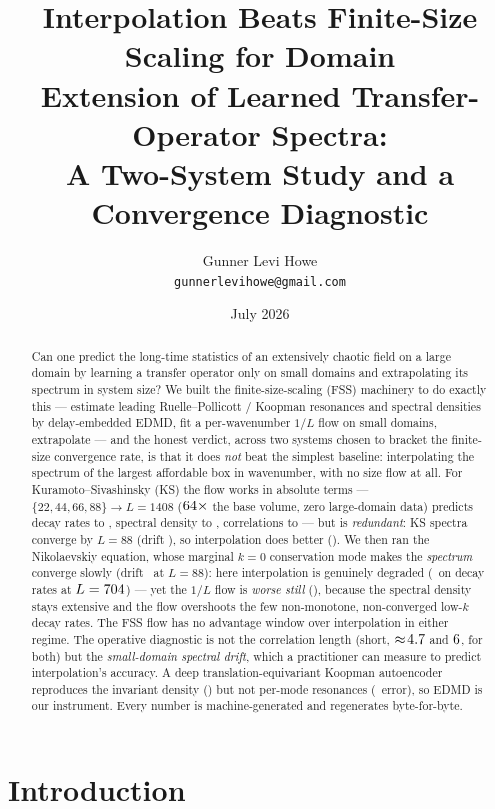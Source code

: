 \documentclass[11pt]{article}
\title{\vspace{-3em}Interpolation Beats Finite-Size Scaling for Domain\\
Extension of Learned Transfer-Operator Spectra:\\
A Two-System Study and a Convergence Diagnostic}
\author{Gunner Levi Howe\\ \small\texttt{gunnerlevihowe@gmail.com}}
\date{July 2026}
\begin{document}
\maketitle

\begin{abstract}
Can one predict the long-time statistics of an extensively chaotic field on a
large domain by learning a transfer operator only on small domains and
extrapolating its spectrum in system size? We built the finite-size-scaling (FSS)
machinery to do exactly this --- estimate leading Ruelle--Pollicott / Koopman
resonances and spectral densities by delay-embedded EDMD, fit a per-wavenumber
$1/L$ flow on small domains, extrapolate --- and the honest verdict, across two
systems chosen to bracket the finite-size convergence rate, is that it does
\emph{not} beat the simplest baseline: interpolating the spectrum of the largest
affordable box in wavenumber, with no size flow at all. For Kuramoto--Sivashinsky
(KS) the flow works in absolute terms --- $\{22,44,66,88\}\!\to\!L=1408$
($64\times$ the base volume, zero large-domain data) predicts decay
rates to \FlowTargetGamma, spectral density to \FlowTargetSPct, correlations to
\FlowTargetC --- but is \emph{redundant}: KS spectra converge by $L=88$ (drift
\ConvEightEightGamma), so interpolation does better (\InterpEightEightGamma). We
then ran the Nikolaevskiy equation, whose marginal $k{=}0$ conservation mode makes
the \emph{spectrum} converge slowly (drift \NikConvEightEight\ at $L=88$): here
interpolation is genuinely degraded (\NikInterpGamma\ on decay rates at
$L=704$) --- yet the $1/L$ flow is \emph{worse still} (\NikFlowGamma),
because the spectral density stays extensive and the flow overshoots the few
non-monotone, non-converged low-$k$ decay rates. The FSS flow has no advantage
window over interpolation in either regime. The operative diagnostic is not the
correlation length (short, $\approx\!4.7$ and $6$, for
both) but the \emph{small-domain spectral drift}, which a practitioner can measure
to predict interpolation's accuracy. A deep translation-equivariant Koopman
autoencoder reproduces the invariant density (\KThreeSMedPct) but not per-mode
resonances (\KThreeOmegaMedRel\ error), so EDMD is our instrument. Every number is
machine-generated and regenerates byte-for-byte.
\end{abstract}

\section{Introduction}
\end{document}
